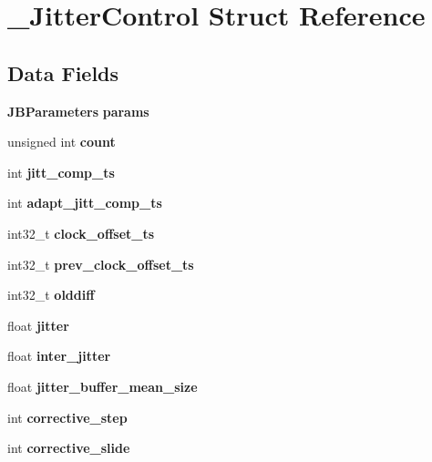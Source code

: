 \section{\+\_\+\+Jitter\+Control Struct Reference}
\label{struct__JitterControl}
\subsection*{Data Fields}
\begin{DoxyCompactItemize}
\item 
\mbox{\label{struct__JitterControl_a6e8cb036c2afbefb7fd9bf334f2d264d}} 
\textbf{ J\+B\+Parameters} {\bfseries params}
\item 
\mbox{\label{struct__JitterControl_a34ba6edf4c45f5126e7c21bb654006eb}} 
unsigned int {\bfseries count}
\item 
\mbox{\label{struct__JitterControl_a3b3189a3ec2c382f7539dbe0280701b3}} 
int {\bfseries jitt\+\_\+comp\+\_\+ts}
\item 
\mbox{\label{struct__JitterControl_abbef84ca13f4b9947284bd9f98f6a552}} 
int {\bfseries adapt\+\_\+jitt\+\_\+comp\+\_\+ts}
\item 
\mbox{\label{struct__JitterControl_ab628a32bbf7d0314cb4511db7e35d8b7}} 
int32\+\_\+t {\bfseries clock\+\_\+offset\+\_\+ts}
\item 
\mbox{\label{struct__JitterControl_ae965017bf162d42e182aa1c260cf5707}} 
int32\+\_\+t {\bfseries prev\+\_\+clock\+\_\+offset\+\_\+ts}
\item 
\mbox{\label{struct__JitterControl_affa7f08b40c8cbee6660d5e5c0ccb010}} 
int32\+\_\+t {\bfseries olddiff}
\item 
\mbox{\label{struct__JitterControl_ad698dd251d540d2eff39fa8a96ec8aee}} 
float {\bfseries jitter}
\item 
\mbox{\label{struct__JitterControl_a5b37b0ee3b47521750dbe2e5ef5bf5dc}} 
float {\bfseries inter\+\_\+jitter}
\item 
\mbox{\label{struct__JitterControl_a56386b947302ced3ca0614bad170f06d}} 
float {\bfseries jitter\+\_\+buffer\+\_\+mean\+\_\+size}
\item 
\mbox{\label{struct__JitterControl_a16e8855e3ea0d5e0204c6e4a73def486}} 
int {\bfseries corrective\+\_\+step}
\item 
\mbox{\label{struct__JitterControl_a1ef036f9242b7af10aa21214a475492c}} 
int {\bfseries corrective\+\_\+slide}
\item 
\mbox{\label{struct__JitterControl_ac7c81b4bd50fc0365dc276abe8ee4be9}} 

\end{DoxyCompactItemize}
